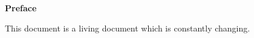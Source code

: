 \begin{center}
	\textbf{Preface}
\end{center}

This document is a living document which is constantly changing.
